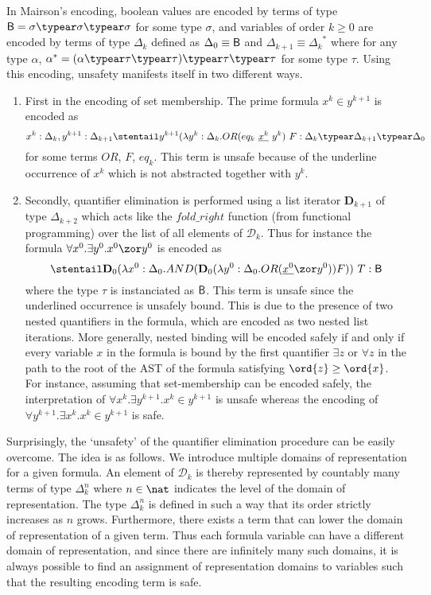 In Mairson's encoding, boolean values are encoded by terms of type
$\booltype = \sigma \typear \sigma\typear \sigma$ for some type
$\sigma$, and variables of order $k \geq 0$ are encoded by terms of
type $\Delta_k$ defined as $\Delta_0 \equiv \mathsf{B}$ and
$\Delta_{k+1} \equiv {\Delta_k}^*$ where for any type $\alpha$,
$\alpha^* = (\alpha \typear \tau \typear \tau)\typear \tau \typear
\tau$ for some type $\tau$. Using this encoding, unsafety manifests
itself in two different ways.
\begin{enumerate}[1.]
  \item
        First in the encoding of set membership. The prime formula $x^k \in y^{k+1}$ is encoded as \begin{equation} x^k : \Delta_k, y^{k+1}:\Delta_{k+1} \stentail y^{k+1} (\lambda y^k : \Delta_k . OR (eq_k~\underline{x^k}~y^k)~F : \Delta_k \typear \Delta_{k+1} \typear \Delta_0 \label{eqn:setmembership}\end{equation}
for some terms $OR$, $F$, $eq_k$.
This term is unsafe because of the underline occurrence of $x^k$ which is not abstracted together with $y^k$.

\item Secondly, quantifier elimination is performed using a list iterator $\mathbf{D}_{k+1}$ of type $\Delta_{k+2}$ which acts like the $fold\_right$ function (from functional programming) over the list of all elements of $\mathcal{D}_k$.
Thus for instance the formula $\forall x^0 . \exists y^0 . x^0
\zor y^0$ is encoded as $$\stentail \mathbf{D}_0 (\lambda
x^0:\Delta_0. AND (\mathbf{D}_0 (\lambda y^0:\Delta_0. OR
(\underline{x^0} \zor y^0)) F))\ T : \booltype$$ where the type
$\tau$ is instanciated as $\mathsf{B}$. This term is unsafe since
the underlined occurrence is unsafely bound. This is due to the
presence of two nested quantifiers in the formula, which are
encoded as two nested list iterations. More generally, nested
binding will be encoded safely if and only if every variable $x$
in the formula is bound by the first quantifier $\exists z$ or
$\forall z$ in the path to the root of the AST of the formula
satisfying $\ord{z} \geq \ord{x}$. For instance, assuming that set-membership
can be encoded safely, the interpretation of $\forall x^k
. \exists y^{k+1} . x^k \in y^{k+1}$ is unsafe whereas the
encoding of $\forall y^{k+1} . \exists x^k . x^k \in y^{k+1}$
is safe.
\end{enumerate}

Surprisingly, the `unsafety' of the quantifier elimination procedure can be easily overcome. The idea is as follows. We introduce multiple domains of representation for a given formula. An element of $\mathcal{D}_k$ is thereby represented by countably many terms of type $\Delta_k^n$ where $n\in\nat$ indicates the level of the domain of representation. The type $\Delta_k^n$ is defined in such a way that its order strictly increases as $n$ grows. Furthermore, there exists a term that can lower the domain of representation of a given term. Thus each formula variable can have a different domain of representation, and since there are infinitely many such domains, it is always possible to find an assignment of representation domains to variables such that the resulting encoding term is safe.

